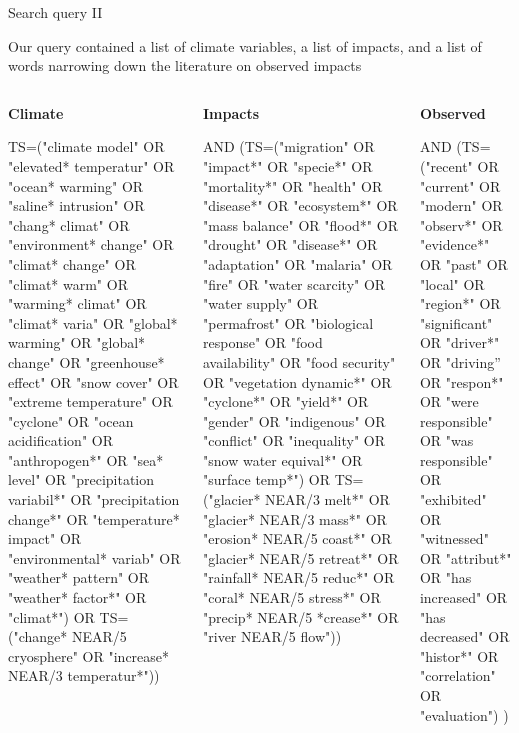 \documentclass[9pt]{beamer}
\begin{document}
\begin{frame}{Search query II}

Our query contained a list of climate variables, a list of impacts, and a list of words narrowing down the literature on observed impacts

\begin{columns}
\begin{column}{0.33\linewidth}
	\textbf{Climate}
	
	\scriptsize
	
	TS=("climate model" OR "elevated* temperatur" OR "ocean* warming" OR "saline* intrusion" OR "chang* climat" OR "environment* change" OR "climat* change" OR "climat* warm" OR "warming* climat" OR "climat* varia" OR "global* warming" OR "global* change" OR "greenhouse* effect" OR "snow cover" OR "extreme temperature" OR "cyclone" OR "ocean acidification" OR "anthropogen*" OR "sea* level" OR "precipitation variabil*" OR "precipitation change*" OR "temperature* impact" OR "environmental* variab" OR "weather* pattern" OR "weather* factor*" OR "climat*") OR TS=("change* NEAR/5 cryosphere" OR "increase* NEAR/3 temperatur*")) 
	
\end{column}
\begin{column}{0.33\linewidth}
	
	\textbf{Impacts}
	
	\scriptsize
	
	AND (TS=("migration" OR "impact*" OR "specie*" OR "mortality*" OR "health" OR "disease*" OR "ecosystem*" OR "mass balance" OR "flood*" OR "drought" OR "disease*" OR "adaptation" OR "malaria" OR "fire" OR "water scarcity" OR "water supply" OR "permafrost" OR "biological response" OR "food availability" OR "food security" OR "vegetation dynamic*" OR "cyclone*" OR "yield*" OR "gender" OR "indigenous" OR "conflict" OR "inequality" OR "snow water equival*" OR "surface temp*") OR TS=("glacier* NEAR/3 melt*" OR "glacier* NEAR/3 mass*" OR "erosion* NEAR/5 coast*" OR "glacier* NEAR/5 retreat*" OR "rainfall* NEAR/5 reduc*" OR "coral* NEAR/5 stress*" OR "precip* NEAR/5 *crease*" OR "river NEAR/5 flow"))
	
\end{column}
\begin{column}{0.33\linewidth}
	
	\textbf{Observed}
	
	\scriptsize
	
	AND (TS=("recent" OR "current" OR "modern" OR "observ*" OR "evidence*" OR "past" OR "local" OR "region*" OR "significant" OR "driver*" OR "driving” OR "respon*" OR "were responsible" OR "was responsible" OR "exhibited" OR "witnessed" OR "attribut*" OR "has increased" OR "has decreased" OR "histor*" OR "correlation" OR "evaluation") )
\end{column}	
\end{columns}

\end{frame}
\end{document}
